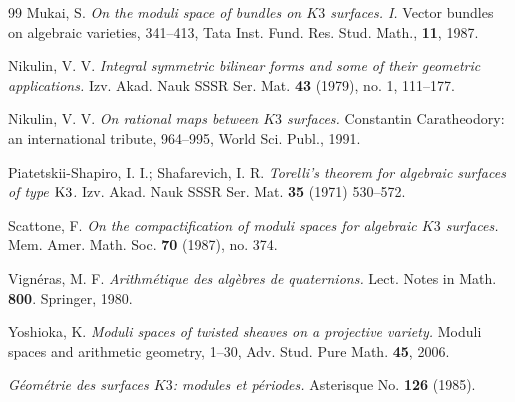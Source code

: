 \documentclass{article}
\theoremstyle{plain}
\theoremstyle{definition}
\theoremstyle{remark}
\begin{document}
\begin{thebibliography}{99}
 Mukai, S. {\it On the moduli space of bundles on $K3$ surfaces. I.\/} Vector bundles on algebraic varieties, 341--413, Tata Inst. Fund. Res. Stud. Math., \textbf{11}, 1987.

 Nikulin, V. V. {\it Integral symmetric bilinear forms and some of their geometric applications.\/}  Izv. Akad. Nauk SSSR Ser. Mat. \textbf{43} (1979), no. 1, 111--177. 

 Nikulin, V. V. {\it On rational maps between $K3$ surfaces.\/}  Constantin Caratheodory: an international tribute, 964--995, World Sci. Publ.,  1991.

 Piatetskii-Shapiro, I. I.; Shafarevich, I. R.  {\it Torelli's theorem for algebraic surfaces of type ${\rm K}3$.\/}  
Izv. Akad. Nauk SSSR Ser. Mat. \textbf{35} (1971) 530--572. 

 Scattone, F. {\it On the compactification of moduli spaces for algebraic $K3$ surfaces.\/} Mem. Amer. Math. Soc. \textbf{70} (1987), no. 374. 

 Vign\'eras, M. F. {\it Arithm\'etique des alg\`ebres de quaternions.\/} Lect. Notes in Math. \textbf{800}. Springer, 1980.

 Yoshioka, K. {\it Moduli spaces of twisted sheaves on a projective variety.\/} Moduli spaces and arithmetic geometry, 1--30, 
Adv. Stud. Pure Math. \textbf{45}, 2006.

 {\it G\'eom\'etrie des surfaces $K3$: modules et p\'eriodes.\/} Asterisque No. \textbf{126} (1985). 


\end{thebibliography}
\end{document}
